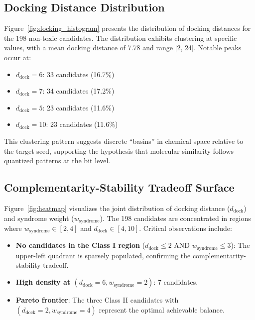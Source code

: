 \documentclass[12pt,a4paper]{article}
\begin{document}
\subsection{Docking Distance Distribution}

Figure~\ref{fig:docking_histogram} presents the distribution of docking distances for the 198 non-toxic candidates. The distribution exhibits clustering at specific values, with a mean docking distance of 7.78 and range [2, 24]. Notable peaks occur at:

\begin{itemize}
\item $d_{\text{dock}} = 6$: 33 candidates (16.7\%)
\item $d_{\text{dock}} = 7$: 34 candidates (17.2\%)
\item $d_{\text{dock}} = 5$: 23 candidates (11.6\%)
\item $d_{\text{dock}} = 10$: 23 candidates (11.6\%)
\end{itemize}

This clustering pattern suggests discrete ``basins'' in chemical space relative to the target seed, supporting the hypothesis that molecular similarity follows quantized patterns at the bit level.

\subsection{Complementarity-Stability Tradeoff Surface}

Figure~\ref{fig:heatmap} visualizes the joint distribution of docking distance ($d_{\text{dock}}$) and syndrome weight ($w_{\text{syndrome}}$). The 198 candidates are concentrated in regions where $w_{\text{syndrome}} \in [2, 4]$ and $d_{\text{dock}} \in [4, 10]$. Critical observations include:

\begin{itemize}
\item \textbf{No candidates in the Class I region} ($d_{\text{dock}} \leq 2$ AND $w_{\text{syndrome}} \leq 3$): The upper-left quadrant is sparsely populated, confirming the complementarity-stability tradeoff.

\item \textbf{High density at $(d_{\text{dock}} = 6, w_{\text{syndrome}} = 2)$}: 7 candidates.

\item \textbf{Pareto frontier}: The three Class II candidates with $(d_{\text{dock}} = 2, w_{\text{syndrome}} = 4)$ represent the optimal achievable balance.
\end{itemize}
\end{document}
